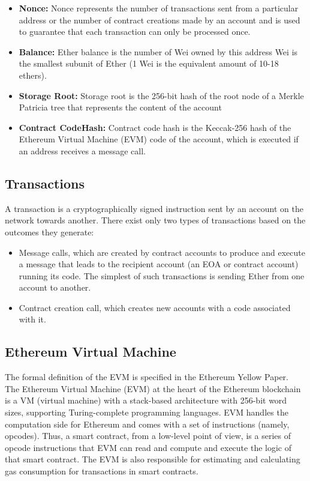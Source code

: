         \begin{itemize}
            \item \textbf{Nonce:} Nonce represents the number of transactions sent from a particular address or the number of contract creations made by an account and is used to guarantee that each transaction can only be processed once.
            \item \textbf{Balance:} Ether balance is the number of Wei owned by this address
                Wei is the smallest subunit of Ether (1 Wei is the equivalent amount of 10-18 ethers).
            \item \textbf{Storage Root:} Storage root is the 256-bit hash of the root node of a Merkle Patricia tree that represents the content of the account 
            \item \textbf{Contract CodeHash:} Contract code hash is the Keccak-256 hash of the Ethereum Virtual Machine (EVM) code of the account, which is executed if an address receives a message call.
        \end{itemize}

    \subsection{Transactions}
    A transaction is a cryptographically signed instruction sent by an account on the network towards another.
    There exist only two types of transactions based on the outcomes they generate:
    \begin{itemize}
        \item Message calls, which are created by contract accounts to produce and execute a message that leads to the recipient account (an EOA or contract account) running its code. The simplest of such transactions is sending Ether from one account to another.
        \item Contract creation call, which creates new accounts with a code associated with it.
    \end{itemize}
    

    \subsection{Ethereum Virtual Machine}
        The formal definition of the EVM is specified in the Ethereum Yellow Paper.~\cite{wood2014ethereum}
        The Ethereum Virtual Machine (EVM) at the heart of the Ethereum blockchain is a VM (virtual machine) with a stack-based architecture with 256-bit word sizes, supporting Turing-complete programming languages.
        EVM handles the computation side for Ethereum and comes with a set of instructions (namely, opcodes).
        Thus, a smart contract, from a low-level point of view, is a series of opcode instructions that EVM can read and compute and execute the logic of that smart contract.
        The EVM is also responsible for estimating and calculating gas consumption for transactions in smart contracts.



